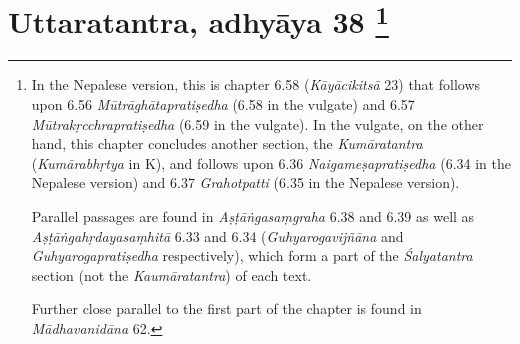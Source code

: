 
\section[Uttaratantra, adhyāya 38]{Uttaratantra, adhyāya 38%
	\footnote{%
	In the Nepalese version, this is chapter 6.58 (\textit{Kāyācikitsā} 23) that follows upon 6.56 \textit{Mūtrāghātapratiṣedha} (6.58 in the vulgate) and 6.57 \textit{Mūtrakṛcchrapratiṣedha} (6.59 in the vulgate). In the vulgate, on the other hand, this chapter concludes another section, the \textit{Kumāratantra} (\textit{Kumārabhṛtya} in K), and follows upon 6.36 \textit{Naigameṣapratiṣedha} (6.34 in the Nepalese version) and 6.37 \textit{Grahotpatti} (6.35 in the Nepalese version).

	Parallel passages are found in \textit{Aṣṭāṅgasaṃgraha} 6.38 and 6.39 as well as \textit{Aṣṭāṅgahṛdayasaṃhitā} 6.33 and 6.34 (\textit{Guhyarogavijñāna} and \textit{Guhyarogapratiṣedha} respectively), which form a part of the \textit{Śalyatantra} section (not the \textit{Kaumāratantra}) of each text.

	Further close parallel to the first part of the chapter is found in \textit{Mādhavanidāna} 62.%
	}%
}

